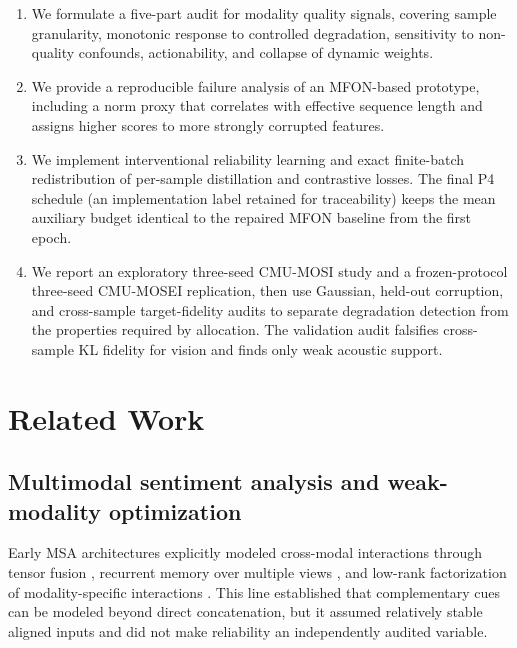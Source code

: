 \begin{enumerate}
\def\labelenumi{\arabic{enumi}.}
\tightlist
\item
  We formulate a five-part audit for modality quality signals, covering
  sample granularity, monotonic response to controlled degradation,
  sensitivity to non-quality confounds, actionability, and collapse of
  dynamic weights.
\item
  We provide a reproducible failure analysis of an MFON-based prototype,
  including a norm proxy that correlates with effective sequence length
  and assigns higher scores to more strongly corrupted features.
\item
  We implement interventional reliability learning and exact
  finite-batch redistribution of per-sample distillation and contrastive
  losses. The final P4 schedule (an implementation label retained for
  traceability) keeps the mean auxiliary budget
  identical to the repaired MFON baseline from the first epoch.
\item
  We report an exploratory three-seed CMU-MOSI study and a frozen-protocol
  three-seed CMU-MOSEI replication, then use Gaussian, held-out corruption,
  and cross-sample target-fidelity audits to separate degradation detection
  from the properties required by allocation. The validation audit falsifies
  cross-sample KL fidelity for vision and finds only weak acoustic support.
\end{enumerate}

\section{Related Work}\label{related-work}

\subsection{Multimodal sentiment analysis and weak-modality
optimization}\label{multimodal-sentiment-analysis-and-weak-modality-optimization}

Early MSA architectures explicitly modeled cross-modal interactions
through tensor fusion \cite{zadeh2017tensor}, recurrent memory over
multiple views \cite{zadeh2018memory}, and low-rank factorization of
modality-specific interactions \cite{liu2018efficient}. This line
established that complementary cues can be modeled beyond direct
concatenation, but it assumed relatively stable aligned inputs and did
not make reliability an independently audited variable.

